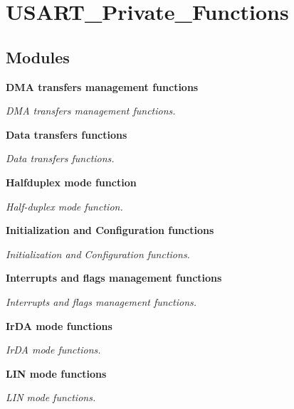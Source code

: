 \section{U\+S\+A\+R\+T\+\_\+\+Private\+\_\+\+Functions}
\label{group__USART__Private__Functions}
\subsection*{Modules}
\begin{DoxyCompactItemize}
\item 
\textbf{ D\+M\+A transfers management functions}
\begin{DoxyCompactList}\small\item\em D\+MA transfers management functions. \end{DoxyCompactList}\item 
\textbf{ Data transfers functions}
\begin{DoxyCompactList}\small\item\em Data transfers functions. \end{DoxyCompactList}\item 
\textbf{ Halfduplex mode function}
\begin{DoxyCompactList}\small\item\em Half-\/duplex mode function. \end{DoxyCompactList}\item 
\textbf{ Initialization and Configuration functions}
\begin{DoxyCompactList}\small\item\em Initialization and Configuration functions. \end{DoxyCompactList}\item 
\textbf{ Interrupts and flags management functions}
\begin{DoxyCompactList}\small\item\em Interrupts and flags management functions. \end{DoxyCompactList}\item 
\textbf{ Ir\+D\+A mode functions}
\begin{DoxyCompactList}\small\item\em Ir\+DA mode functions. \end{DoxyCompactList}\item 
\textbf{ L\+I\+N mode functions}
\begin{DoxyCompactList}\small\item\em L\+IN mode functions. \end{DoxyCompactList}\item 

\end{DoxyCompactItemize}
